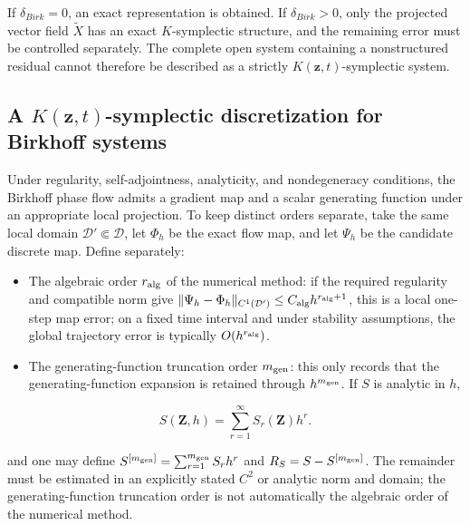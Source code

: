 If \(\delta_{Birk} = 0\), an exact representation is obtained. If \(\delta_{Birk} > 0\), only the projected vector field \(\widetilde{X}\) has an exact \(K\)-symplectic structure, and the remaining error must be controlled separately. The complete open system containing a nonstructured residual cannot therefore be described as a strictly \(K\left( \mathbf{z},t \right)\)-symplectic system.

\subsection{\texorpdfstring{A \(K\left( \mathbf{z},t \right)\)-symplectic discretization for Birkhoff systems}{A K-symplectic discretization for Birkhoff systems}}\label{sec:symplectic-kam-5-5}

Under regularity, self-adjointness, analyticity, and nondegeneracy conditions, the Birkhoff phase flow admits a gradient map and a scalar generating function under an appropriate local projection. To keep distinct orders separate, take the same local domain \(\mathcal{D}'\Subset\mathcal{D}\), let \(\Phi_h\) be the exact flow map, and let \(\Psi_h\) be the candidate discrete map. Define separately:

\begin{itemize}
\tightlist
\item
  The algebraic order \(r_{\rm alg}\) of the numerical method: if the required regularity and compatible norm give \(\|\Psi_h-\Phi_h\|_{C^{1}(\mathcal{D}')}\leq C_{\rm alg}h^{r_{\rm alg}+1}\), this is a local one-step map error; on a fixed time interval and under stability assumptions, the global trajectory error is typically \(O(h^{r_{\rm alg}})\).
\item
  The generating-function truncation order \(m_{\rm gen}\): this only records that the generating-function expansion is retained through \(h^{m_{\rm gen}}\). If \(S\) is analytic in \(h\),
\end{itemize}

\begin{equation}
\label{eq:symplectic-kam-5-14}
S\left( \mathbf{Z},h \right) = \sum_{r = 1}^{\infty}S_{r}\left( \mathbf{Z} \right)h^{r}.
\end{equation}

and one may define \(S^{[m_{\rm gen}]}=\sum_{r=1}^{m_{\rm gen}}S_rh^r\) and \(R_S=S-S^{[m_{\rm gen}]}\). The remainder must be estimated in an explicitly stated \(C^{2}\) or analytic norm and domain; the generating-function truncation order is not automatically the algebraic order of the numerical method.

